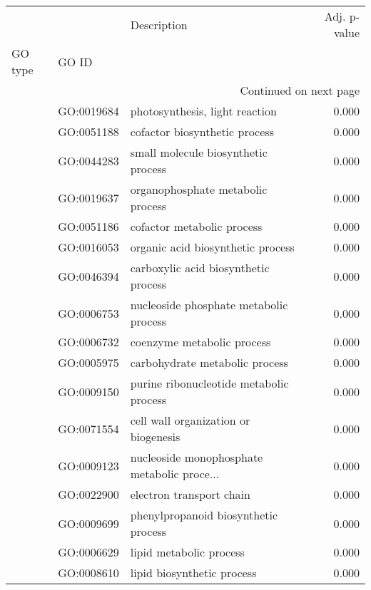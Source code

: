 \begin{longtable}{lllr}
\toprule
   &            &                                  Description &  Adj. p-value \\
GO type & GO ID &                                              &               \\
\midrule
\endhead
\midrule
\multicolumn{4}{r}{{Continued on next page}} \\
\midrule
\endfoot

\bottomrule
\endlastfoot
\multirow{186}{*}{BP} & GO:0019684 &               photosynthesis, light reaction &         0.000 \\
   & GO:0051188 &                cofactor biosynthetic process &         0.000 \\
   & GO:0044283 &          small molecule biosynthetic process &         0.000 \\
   & GO:0019637 &            organophosphate metabolic process &         0.000 \\
   & GO:0051186 &                   cofactor metabolic process &         0.000 \\
   & GO:0016053 &            organic acid biosynthetic process &         0.000 \\
   & GO:0046394 &         carboxylic acid biosynthetic process &         0.000 \\
   & GO:0006753 &       nucleoside phosphate metabolic process &         0.000 \\
   & GO:0006732 &                   coenzyme metabolic process &         0.000 \\
   & GO:0005975 &               carbohydrate metabolic process &         0.000 \\
   & GO:0009150 &      purine ribonucleotide metabolic process &         0.000 \\
   & GO:0071554 &         cell wall organization or biogenesis &         0.000 \\
   & GO:0009123 &  nucleoside monophosphate metabolic proce... &         0.000 \\
   & GO:0022900 &                     electron transport chain &         0.000 \\
   & GO:0009699 &         phenylpropanoid biosynthetic process &         0.000 \\
   & GO:0006629 &                      lipid metabolic process &         0.000 \\
   & GO:0008610 &                   lipid biosynthetic process &         0.000 \\

\end{longtable}
